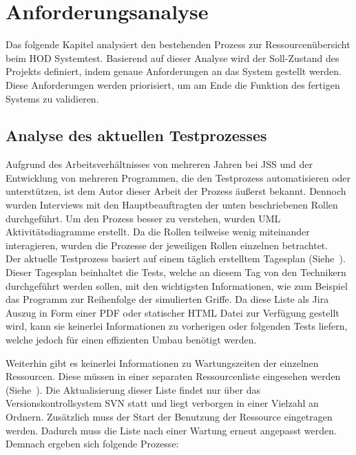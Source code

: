 \section{Anforderungsanalyse}
Das folgende Kapitel analysiert den bestehenden Prozess zur Ressourcenübersicht
beim \gls{HOD} Systemtest. Basierend auf dieser Analyse wird der Soll-Zustand 
des Projekts definiert, indem genaue Anforderungen an das System gestellt werden. 
Diese Anforderungen werden priorisiert, um am Ende die Funktion des 
fertigen Systems zu validieren.

\subsection{Analyse des aktuellen Testprozesses}
Aufgrund des Arbeitsverhältnisses von mehreren Jahren bei \gls{JSS} und der Entwicklung
von mehreren Programmen, die den Testprozess automatisieren oder unterstützen, ist
dem Autor dieser Arbeit der Prozess äußerst bekannt. Dennoch wurden Interviews mit den Hauptbeauftragten
der unten beschriebenen Rollen durchgeführt. Um den Prozess besser zu verstehen,
wurden UML Aktivitätsdiagramme erstellt. Da die Rollen teilweise wenig 
miteinander interagieren, wurden die Prozesse der jeweiligen Rollen einzelnen
betrachtet.\\

Der aktuelle Testprozess basiert auf einem täglich erstelltem Tagesplan 
(Siehe~). Dieser Tagesplan beinhaltet die Tests, welche an diesem
Tag von den \gls{Techniker}n durchgeführt werden sollen, mit den wichtigsten 
Informationen, wie zum Beispiel das Programm zur Reihenfolge der simulierten Griffe.
Da diese Liste als \gls{Jira} Auszug in Form einer \gls{PDF} oder statischer \gls{HTML} Datei zur Verfügung 
gestellt wird, kann sie keinerlei Informationen zu vorherigen oder folgenden 
Tests liefern, welche jedoch für einen effizienten Umbau benötigt werden.

Weiterhin gibt es keinerlei Informationen zu Wartungszeiten der einzelnen Ressourcen.
Diese müssen in einer separaten Ressourcenliste eingesehen werden
(Siehe~). Die Aktualisierung dieser Liste findet nur über 
das Versionskontrollsystem \gls{SVN} statt und liegt verborgen in einer Vielzahl
an Ordnern. Zusätzlich muss der Start der Benutzung der Ressource eingetragen
werden. Dadurch muss die Liste nach einer Wartung erneut angepasst werden. \\

 
Demnach ergeben sich folgende Prozesse:

